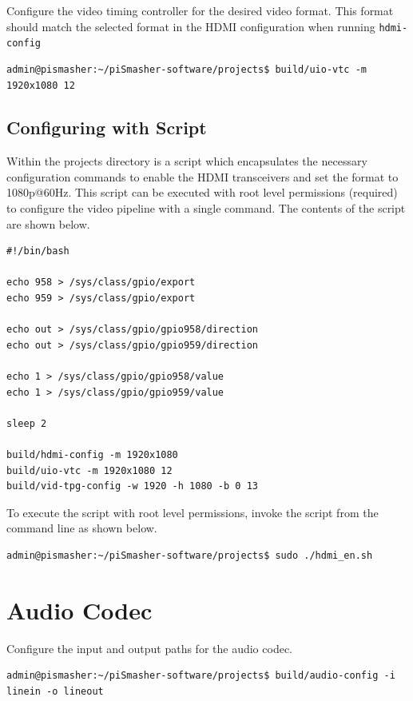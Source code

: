 \documentclass[sfsidenotes, justified]{tufte-handout}
\begin{document}
	Configure the video timing controller for the desired video format. This format should match the selected format in the HDMI configuration when running \texttt{hdmi-config}

\begin{fullwidth}
\begin{lstlisting}
admin@pismasher:~/piSmasher-software/projects$ build/uio-vtc -m 1920x1080 12
\end{lstlisting}
\end{fullwidth}

	\subsection{Configuring with Script}
	
	Within the projects directory is a script which encapsulates the necessary configuration commands to enable the HDMI transceivers and set the format to 1080p@60Hz. This script can be executed with root level permissions (required) to configure the video pipeline with a single command. The contents of the script are shown below.
	
	\newpage
	\begin{lstlisting}[style=text]
#!/bin/bash

echo 958 > /sys/class/gpio/export
echo 959 > /sys/class/gpio/export

echo out > /sys/class/gpio/gpio958/direction
echo out > /sys/class/gpio/gpio959/direction

echo 1 > /sys/class/gpio/gpio958/value
echo 1 > /sys/class/gpio/gpio959/value

sleep 2

build/hdmi-config -m 1920x1080
build/uio-vtc -m 1920x1080 12
build/vid-tpg-config -w 1920 -h 1080 -b 0 13
	\end{lstlisting}
	
	To execute the script with root level permissions, invoke the script from the command line as shown below.
	
	\begin{lstlisting}[style=text]
admin@pismasher:~/piSmasher-software/projects$ sudo ./hdmi_en.sh
	\end{lstlisting}


\section{Audio Codec}

Configure the input and output paths for the audio codec.

\begin{fullwidth}
\begin{lstlisting}
admin@pismasher:~/piSmasher-software/projects$ build/audio-config -i linein -o lineout
\end{lstlisting}
\end{fullwidth}
\end{document}
